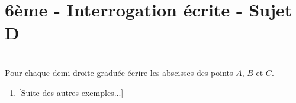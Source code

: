 


\pagestyle{empty}
\section*{6ème - Interrogation écrite - Sujet D}

\\
Pour chaque demi-droite graduée écrire les abscisses des points $A$, $B$ et $C$.
\begin{enumerate}
\item
\begin{minipage}{18cm}
\begin{DroiteGraduee}[none]{15}{0}{7}{5}{1}{0}{0}
\end{DroiteGraduee}
\end{minipage}
[Suite des autres exemples...]
\end{enumerate}
